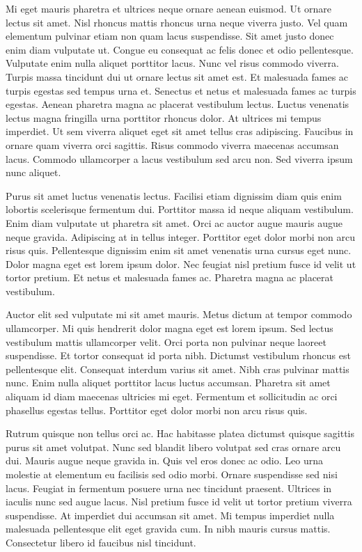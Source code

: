 \documentclass[11pt,a4paper]{article}
\begin{document}
Mi eget mauris pharetra et ultrices neque ornare aenean euismod. Ut ornare lectus sit amet. Nisl rhoncus mattis rhoncus urna neque viverra justo. Vel quam elementum pulvinar etiam non quam lacus suspendisse. Sit amet justo donec enim diam vulputate ut. Congue eu consequat ac felis donec et odio pellentesque. Vulputate enim nulla aliquet porttitor lacus. Nunc vel risus commodo viverra. Turpis massa tincidunt dui ut ornare lectus sit amet est. Et malesuada fames ac turpis egestas sed tempus urna et. Senectus et netus et malesuada fames ac turpis egestas. Aenean pharetra magna ac placerat vestibulum lectus. Luctus venenatis lectus magna fringilla urna porttitor rhoncus dolor. At ultrices mi tempus imperdiet. Ut sem viverra aliquet eget sit amet tellus cras adipiscing. Faucibus in ornare quam viverra orci sagittis. Risus commodo viverra maecenas accumsan lacus. Commodo ullamcorper a lacus vestibulum sed arcu non. Sed viverra ipsum nunc aliquet.

Purus sit amet luctus venenatis lectus. Facilisi etiam dignissim diam quis enim lobortis scelerisque fermentum dui. Porttitor massa id neque aliquam vestibulum. Enim diam vulputate ut pharetra sit amet. Orci ac auctor augue mauris augue neque gravida. Adipiscing at in tellus integer. Porttitor eget dolor morbi non arcu risus quis. Pellentesque dignissim enim sit amet venenatis urna cursus eget nunc. Dolor magna eget est lorem ipsum dolor. Nec feugiat nisl pretium fusce id velit ut tortor pretium. Et netus et malesuada fames ac. Pharetra magna ac placerat vestibulum.

Auctor elit sed vulputate mi sit amet mauris. Metus dictum at tempor commodo ullamcorper. Mi quis hendrerit dolor magna eget est lorem ipsum. Sed lectus vestibulum mattis ullamcorper velit. Orci porta non pulvinar neque laoreet suspendisse. Et tortor consequat id porta nibh. Dictumst vestibulum rhoncus est pellentesque elit. Consequat interdum varius sit amet. Nibh cras pulvinar mattis nunc. Enim nulla aliquet porttitor lacus luctus accumsan. Pharetra sit amet aliquam id diam maecenas ultricies mi eget. Fermentum et sollicitudin ac orci phasellus egestas tellus. Porttitor eget dolor morbi non arcu risus quis.

Rutrum quisque non tellus orci ac. Hac habitasse platea dictumst quisque sagittis purus sit amet volutpat. Nunc sed blandit libero volutpat sed cras ornare arcu dui. Mauris augue neque gravida in. Quis vel eros donec ac odio. Leo urna molestie at elementum eu facilisis sed odio morbi. Ornare suspendisse sed nisi lacus. Feugiat in fermentum posuere urna nec tincidunt praesent. Ultrices in iaculis nunc sed augue lacus. Nisl pretium fusce id velit ut tortor pretium viverra suspendisse. At imperdiet dui accumsan sit amet. Mi tempus imperdiet nulla malesuada pellentesque elit eget gravida cum. In nibh mauris cursus mattis. Consectetur libero id faucibus nisl tincidunt.
\end{document}
